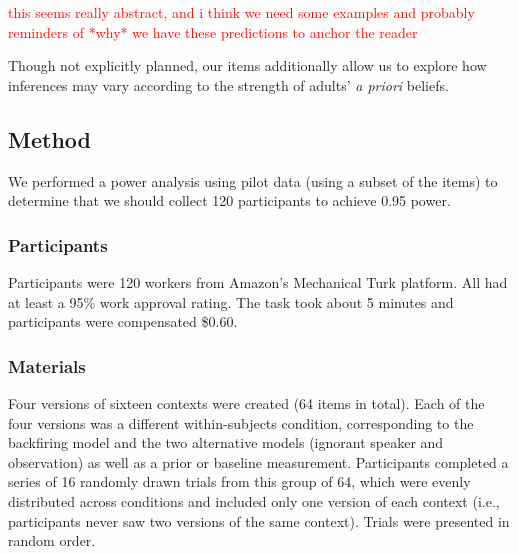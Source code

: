 \documentclass[10pt,letterpaper]{article}
\newcommand{\red}[1]{\textcolor{Red}{#1}}
\begin{document}
\red{this seems really abstract, and i think we need some examples and probably reminders of *why* we have these predictions to anchor the reader}

Though not explicitly planned, our items additionally allow us to explore how inferences may vary according to the strength of adults' \emph{a priori} beliefs.



\subsection{Method}

We performed a power analysis using pilot data (using a subset of the items) to determine that we should collect 120 participants to achieve 0.95 power. 

\subsubsection{Participants}

Participants were 120 workers from Amazon's Mechanical Turk platform. 
All had at least a 95\% work approval rating.
The task took about 5 minutes and participants were compensated \$0.60.

\subsubsection{Materials}

Four versions of sixteen contexts were created (64 items in total). 
Each of the four versions was a different within-subjects condition, corresponding to the backfiring model and the two alternative models (ignorant speaker and observation) as well as a prior or baseline measurement. 
Participants completed a series of 16 randomly drawn trials from this group of 64, which were evenly distributed across conditions and included only one version of each context (i.e., participants never saw two versions of the same context).  
Trials were presented in random order.
\end{document}
